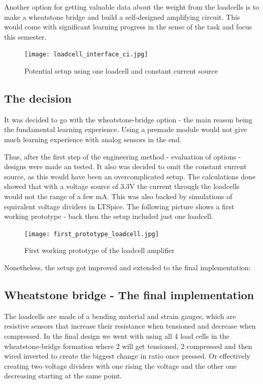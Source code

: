 \documentclass[../report.tex]{subfiles}
\begin{document}
Another option for getting valuable data about the weight from the loadcells
is to make a wheatstone bridge and build a self-designed amplifying circuit.
This would come with significant learning progress in the sense of the task and 
focus this semester.

\begin{figure}[H]
  \centering
  \texttt{[image: loadcell\_interface\_ci.jpg]}
  \caption{Potential setup using one loadcell and constant current source}
\end{figure} 

\subsection{The decision}
It was decided to go with the wheatstone-bridge option - the main reason being
the fundamental learning experience. Using a premade module would not give much 
learning experience with analog sensors in the end. 

\quad
Thus, after the first step of the engineering method - evaluation of options -
designs were made an tested.
It also was decided to omit the constant current source, as this would have been an 
overcomplicated setup. The calculations done showed that with a voltage source of 3.3V
the current through the loadcells would not the range of a few mA. This was also backed
by simulations of equivalent voltage dividers in LTSpice.
The following picture shows a first working prototype - back then the setup included just one loadcell. 
\begin{figure}[H]
  \centering
  \texttt{[image: first\_prototype\_loadcell.jpg]}
  \caption{First working prototype of the loadcell amplifier}
\end{figure}

Nonetheless, the setup got improved 
and extended to the final implementation:
\subsection{Wheatstone bridge - The final implementation}

The loadcells are made of a bending material and strain gauges, which are resistive
sensors that increase their resistance when tensioned and decrease when compressed.
In the final design we went with using all 4 load cells in the wheatstone-bridge formation
where 2 will get tensioned, 2 compressed and then wired inverted to create the biggest change
in ratio once pressed. Or effectively creating two voltage dividers with one rising the voltage
and the other one decreasing starting at the same point.
\end{document}
